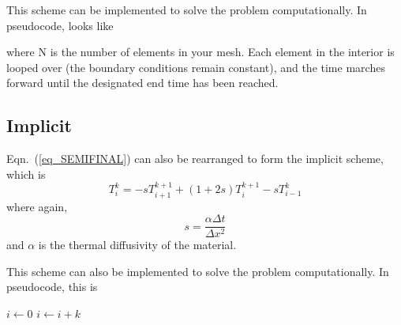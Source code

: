 \documentclass[twocolumn,10pt]{asme2ej}
\begin{document}
This scheme can be implemented to solve the problem computationally. In pseudocode, looks like
\begin{algorithmic}
    \EndFor
\EndWhile
\end{algorithmic}
\noindent where N is the number of elements in your mesh. Each element in the interior is looped over (the boundary conditions remain constant), and the time marches forward until the designated end time has been reached.

\subsection{Implicit}
Eqn.~(\ref{eq_SEMIFINAL}) can also be rearranged to form the implicit scheme, which is
\begin{equation}
T_i^k = -sT_{i+1}^{k+1} +(1+2s)T_i^{k+1} - sT_{i-1}^k
\end{equation}
\noindent where again,
\begin{equation}
s = \frac{\alpha \Delta t}{\Delta x^2}
\end{equation}
\noindent and $\alpha$ is the thermal diffusivity of the material.

This scheme can also be implemented to solve the problem computationally. In pseudocode, this is
\begin{algorithmic}
    \State $i\gets 0$
\Else
        \State $i\gets i+k$
    \EndIf
\EndIf
\end{algorithmic}






\end{document}
